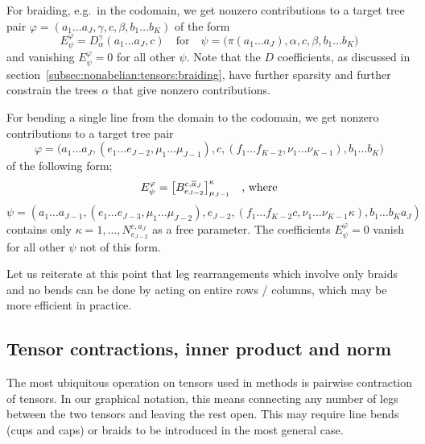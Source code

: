 For braiding, e.g.~in the codomain, we get nonzero contributions to a target tree pair $\varphi = (a_1\dots a_J, \gamma, c, \beta, b_1\dots b_K)$ of the form 
\begin{equation}
    E^\varphi_\psi = D^\gamma_\alpha(a_1\dots a_J, c)
    \quad \text{for} \quad 
    \psi = \big(\pi(a_1\dots a_J), \alpha, c, \beta, b_1 \dots b_K\big)
\end{equation}
and vanishing $E^\varphi_\psi = 0$ for all other $\psi$.
%
Note that the $D$ coefficients, as discussed in section~\ref{subsec:nonabelian:tensors:braiding}, have further sparsity and further constrain the trees $\alpha$ that give nonzero contributions.

For bending a single line from the domain to the codomain, we get nonzero contributions
to a target tree pair 
$$\varphi = \big( a_1\dots a_J, (e_1\dots e_{J-2}, \mu_1\dots\mu_{J-1}), c, (f_1\dots f_{K-2}, \nu_1\dots \nu_{K-1}), b_1\dots b_K \big)$$
of the following form;
\begin{equation}
    E^\varphi_\psi = \big[B^{c,\overline{a}_J}_{e_{J-2}} \big]^\kappa_{\mu_{J-1}}
    \quad\text{, where}
\end{equation}
$$
    \psi \!=\!
    (
    a_1\dots a_{J-1},
    (e_1\dots e_{J-3}, \mu_1\dots\mu_{J-2}),
    e_{J-2},
    (f_1\dots f_{K-2} c, \nu_1\dots \nu_{K-1} \kappa),
    b_1\dots b_K a_{J}
    )
$$
contains only $\kappa = 1, \dots, N^{c,a_J}_{e_{J-2}}$ as a free parameter.
%
The coefficients $E^\varphi_\psi = 0$ vanish for all other $\psi$ not of this form.

Let us reiterate at this point that leg rearrangements which involve only braids and no bends can be done by acting on entire rows / columns, which may be more efficient in practice.

\subsection{Tensor contractions, inner product and norm}
\label{subsec:nonabelian:tensors:contraction}

The most ubiquitous operation on tensors used in  methods is pairwise contraction of tensors.
%
In our graphical notation, this means connecting any number of legs between the two tensors and leaving the rest open.
%
This may require line bends (cups and caps) or braids to be introduced in the most general case.

